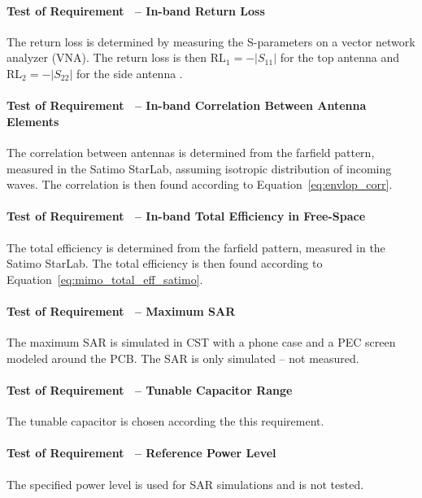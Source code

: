 \paragraph{Test of Requirement~ -- In-band Return Loss}
The return loss is determined by measuring the S-parameters on a vector network analyzer (VNA). The return loss is then $\text{RL}_1 = -|S_{11}|$ for the top antenna and $\text{RL}_2 = -|S_{22}|$ for the side antenna \cite{pozar2011microwave}.

\paragraph{Test of Requirement~ -- In-band Correlation Between Antenna Elements}
The correlation between antennas is determined from the farfield pattern, measured in the Satimo StarLab, assuming isotropic distribution of incoming waves. The correlation is then found according to Equation~\ref{eq:envlop_corr}.

\paragraph{Test of Requirement~ -- In-band Total Efficiency in Free-Space}
The total efficiency is determined from the farfield pattern, measured in the Satimo StarLab.
The total efficiency is then found according to Equation~\ref{eq:mimo_total_eff_satimo}.

\paragraph{Test of Requirement~ -- Maximum SAR}
The maximum SAR is simulated in CST with a phone case and a PEC screen modeled around the PCB. The SAR is only simulated -- not measured.

\paragraph{Test of Requirement~ -- Tunable Capacitor Range} 
The tunable capacitor is chosen according the this requirement.

\paragraph{Test of Requirement~ -- Reference Power Level}
The specified power level is used for SAR simulations and is not tested.

